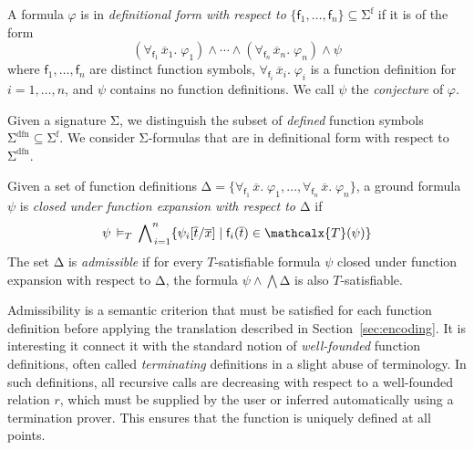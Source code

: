 \documentclass[runningheads,a4paper]{llncs}
\renewcommand\models{\mathrel{\vDash}}
\newcommand\DDD{\Delta}
\newcommand{\con}[1]{\mathsf{#1}}
\renewcommand\vec[1]{\overline{#1}}
\let\oldSigma=\Sigma
\def\Sigma{\mathrm{\oldSigma}}
\let\oldDelta=\Delta
\def\Delta{\mathrm{\oldDelta}}
\let\oldwedge=\wedge
\def\wedge{\mathrel{\oldwedge}}
\newcommand{\terms}{\mathcalx{T}}
\newcommand{\sfuns}[1]{#1^\mathrm{f}}
\newcommand{\sfundefs}[1]{#1^\mathrm{dfn}}
\newcommand{\forallf}[1]{\forall_{\!#1\:}}
\newcommand{\rem}[1]{\textcolor{red}{[#1]}}
\newcommand{\jb}[1]{\rem{#1 --jb}}
\newcommand{\ct}[1]{\rem{#1 --ct}}
\begin{document}
\begin{definition}\rm
A formula $\varphi$ is in \emph{definitional form with respect to}
$\{ \con{f}_1, \ldots, \con{f}_n \} \subseteq \sfuns{\Sigma}$ if it is of the
form
%
%
\[(\forallf{\con{f}_1} \vec x_1.\; \varphi_1) \wedge \cdots \wedge
(\forallf{\con{f}_n} \vec x_n.\; \varphi_n) \wedge \psi\]
%
where $\con{f}_1, \ldots, \con{f}_n$ are distinct function symbols,
$\forallf{\con{f}_i} \vec x_i.\; \varphi_i$ is a function definition
for $i = 1, \ldots, n$,
%
and $\psi$ contains no function definitions.
We call $\psi$ the \emph{conjecture} of $\varphi$.
\end{definition}

Given a signature $\Sigma$, we distinguish the subset of \emph{defined}
function symbols $\sfundefs{\Sigma} \subseteq \sfuns{\Sigma}$.
We consider $\Sigma$-formulas that are in definitional form with respect to
$\sfundefs{\Sigma}$.

\begin{definition}\rm
Given a set of function definitions 
$\DDD = \{ \forallf{\con{f}_1} \vec x.\; \varphi_1, \ldots, \forallf{\con{f}_n} \vec x.\; \varphi_n \}$, 
a ground formula $\psi$ 
is \emph{closed under function expansion with respect to $\DDD$} if 
\[
 \psi \,\models_T\, \bigwedge\nolimits_{\,i=1}^{n} \{ \psi_i[ \vec t / \vec x ] \mid \con{f}_i( \vec t ) \in \terms( \psi ) \} %
\]
The set $\DDD$ is \emph{admissible} if for every $T$-satisfiable formula 
$\psi$ closed under function expansion with respect to $\DDD$,
the formula
$\psi \wedge \bigwedge \Delta$ is also $T$-satisfiable.
\end{definition}

Admissibility is a semantic criterion that must be satisfied for each function
definition before applying the translation described in
Section~\ref{sec:encoding}. It is interesting it connect it with the
standard notion of \emph{well-founded} function definitions, often called
\emph{terminating} definitions in a slight abuse of terminology. In such
definitions, all recursive calls are decreasing with respect to a well-founded
relation $r$, which must be supplied by the user or inferred automatically
using a termination prover. This ensures that the function is uniquely defined
at all points.
\end{document}
